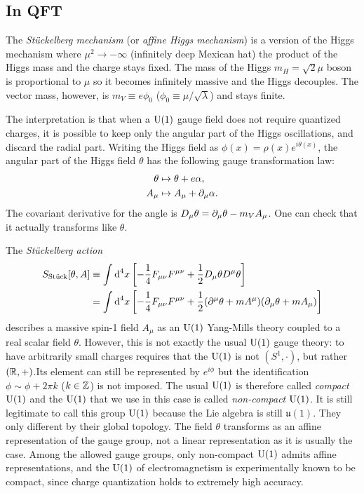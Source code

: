 \documentclass[a4paper,8pt]{article}
\begin{document}
    \subsection{In QFT}

        The \emph{Stückelberg mechanism} (or \emph{affine Higgs mechanism}) is a version of the Higgs mechanism where $\mu^2\to-\infty$ (infinitely deep Mexican hat) the product of the Higgs mass and the charge stays fixed. The mass of the Higgs $m_H=\sqrt{2}\mu$ boson is proportional to $\mu$ so it becomes infinitely massive and the Higgs decouples. The vector mass, however, is $m_V\equiv e\phi_0$ ($\phi_0\equiv\mu/\sqrt{\lambda}$) and stays finite.

        The interpretation is that when a $\text{U}(1)$ gauge field does not require quantized charges, it is possible to keep only the angular part of the Higgs oscillations, and discard the radial part. Writing the Higgs field as $\phi(x)=\rho(x)e^{i\theta(x)}$, the angular part of the Higgs field $\theta$ has the following gauge transformation law:
        \begin{align}
            \theta &\mapsto \theta+e\alpha,\\
            A_\mu &\mapsto A_\mu+\partial_\mu\alpha.
        \end{align}
        The covariant derivative for the angle is $D_\mu\theta=\partial_\mu\theta-m_VA_\mu$. One can check that it actually transforms like $\theta$.

        The \emph{Stückelberg action}
        \begin{align}
            S_{\text{Stück}}[\theta,A] &\equiv \int\text{d}^4x\left[-\frac{1}{4}F_{\mu\nu}F^{\mu\nu}+\frac{1}{2}D_\mu\theta D^\mu\theta\right]\\
            &= \int\text{d}^4x\left[ -\frac{1}{4}F_{\mu\nu}F^{\mu\nu}+\frac{1}{2}(\partial^\mu\theta+mA^\mu)(\partial_\mu\theta+mA_\mu) \right]
        \end{align}
        describes a massive spin-1 field $A_\mu$ as an $\text{U}(1)$ Yang-Mills theory coupled to a real scalar field $\theta$. However, this is not exactly the usual $\text{U}(1)$ gauge theory: to have arbitrarily small charges requires that the $\text{U}(1)$ is not $(S^1,\cdot)$, but rather $(\mathbb{R},+)$.Its element can still be represented by $e^{i\phi}$ but the identification $\phi\sim\phi+2\pi k$ ($k\in\mathbb{Z}$) is not imposed. The usual $\text{U}(1)$ is therefore called \emph{compact $\text{U}(1)$} and the $\text{U}(1)$ that we use in this case is called \emph{non-compact $\text{U}(1)$}. It is still legitimate to call this group $\text{U}(1)$ because the Lie algebra is still $\mathfrak{u}(1)$. They only different by their global topology. The field $\theta$ transforms as an affine representation of the gauge group, not a linear representation as it is usually the case. Among the allowed gauge groups, only non-compact $\text{U}(1)$ admits affine representations, and the $\text{U}(1)$ of electromagnetism is experimentally known to be compact, since charge quantization holds to extremely high accuracy.
\end{document}
